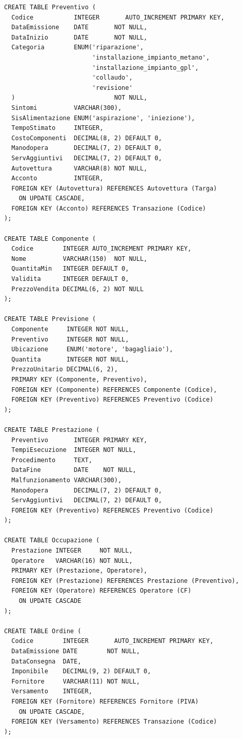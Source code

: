 \begin{lstlisting}
CREATE TABLE Preventivo (
  Codice           INTEGER       AUTO_INCREMENT PRIMARY KEY,
  DataEmissione    DATE       NOT NULL,
  DataInizio       DATE       NOT NULL,
  Categoria        ENUM('riparazione',
                        'installazione_impianto_metano',
                        'installazione_impianto_gpl',
                        'collaudo',
                        'revisione'
  )                           NOT NULL,
  Sintomi          VARCHAR(300),
  SisAlimentazione ENUM('aspirazione', 'iniezione'),
  TempoStimato     INTEGER,
  CostoComponenti  DECIMAL(8, 2) DEFAULT 0,
  Manodopera       DECIMAL(7, 2) DEFAULT 0,
  ServAggiuntivi   DECIMAL(7, 2) DEFAULT 0,
  Autovettura      VARCHAR(8) NOT NULL,
  Acconto          INTEGER,
  FOREIGN KEY (Autovettura) REFERENCES Autovettura (Targa)
    ON UPDATE CASCADE,
  FOREIGN KEY (Acconto) REFERENCES Transazione (Codice)
);

CREATE TABLE Componente (
  Codice        INTEGER AUTO_INCREMENT PRIMARY KEY,
  Nome          VARCHAR(150)  NOT NULL,
  QuantitaMin   INTEGER DEFAULT 0,
  Validita      INTEGER DEFAULT 0,
  PrezzoVendita DECIMAL(6, 2) NOT NULL
);

CREATE TABLE Previsione (
  Componente     INTEGER NOT NULL,
  Preventivo     INTEGER NOT NULL,
  Ubicazione     ENUM('motore', 'bagagliaio'),
  Quantita       INTEGER NOT NULL,
  PrezzoUnitario DECIMAL(6, 2),
  PRIMARY KEY (Componente, Preventivo),
  FOREIGN KEY (Componente) REFERENCES Componente (Codice),
  FOREIGN KEY (Preventivo) REFERENCES Preventivo (Codice)
);

CREATE TABLE Prestazione (
  Preventivo       INTEGER PRIMARY KEY,
  TempiEsecuzione  INTEGER NOT NULL,
  Procedimento     TEXT,
  DataFine         DATE    NOT NULL,
  Malfunzionamento VARCHAR(300),
  Manodopera       DECIMAL(7, 2) DEFAULT 0,
  ServAggiuntivi   DECIMAL(7, 2) DEFAULT 0,
  FOREIGN KEY (Preventivo) REFERENCES Preventivo (Codice)
);

CREATE TABLE Occupazione (
  Prestazione INTEGER     NOT NULL,
  Operatore   VARCHAR(16) NOT NULL,
  PRIMARY KEY (Prestazione, Operatore),
  FOREIGN KEY (Prestazione) REFERENCES Prestazione (Preventivo),
  FOREIGN KEY (Operatore) REFERENCES Operatore (CF)
    ON UPDATE CASCADE
);

CREATE TABLE Ordine (
  Codice        INTEGER       AUTO_INCREMENT PRIMARY KEY,
  DataEmissione DATE        NOT NULL,
  DataConsegna  DATE,
  Imponibile    DECIMAL(9, 2) DEFAULT 0,
  Fornitore     VARCHAR(11) NOT NULL,
  Versamento    INTEGER,
  FOREIGN KEY (Fornitore) REFERENCES Fornitore (PIVA)
    ON UPDATE CASCADE,
  FOREIGN KEY (Versamento) REFERENCES Transazione (Codice)
);


\end{lstlisting}
